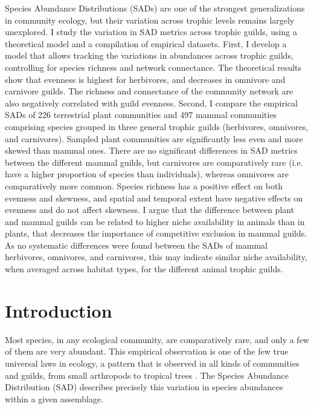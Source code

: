 Species Abundance Distributions (SADs) are one of the strongest generalizations in community ecology, but their variation across trophic levels remains largely unexplored. I study the variation in SAD metrics across trophic guilds, using a theoretical model and a compilation of empirical datasets. First, I develop a model that allows tracking the variations in abundances across trophic guilds, controlling for species richness and network connectance. The theoretical results show that evenness is highest for herbivores, and decreases in omnivore and carnivore guilds. The richness and connectance of the community network are also negatively correlated with guild evenness. Second, I compare the empirical SADs of 226 terrestrial plant communities and 497 mammal communities comprising species grouped in three general trophic guilds (herbivores, omnivores, and carnivores). Sampled plant communities are significantly less even and more skewed than mammal ones. There are no significant differences in SAD metrics between the different mammal guilds, but carnivores are comparatively rare (i.e. have a higher proportion of species than individuals), whereas omnivores are comparatively more common. Species richness has a positive effect on both evenness and skewness, and spatial and temporal extent have negative effects on evenness and do not affect skewness. I argue that the difference between plant and mammal guilds can be related to higher niche availability in animals than in plants, that decreases the importance of competitive exclusion in mammal guilds. As no systematic differences were found between the SADs of mammal herbivores, omnivores, and carnivores, this may indicate similar niche availability, when averaged across habitat types, for the different animal trophic guilds.

\section{Introduction}

Most species, in any ecological community, are comparatively rare, and only a few of them are very abundant. This empirical observation is one of the few true universal laws in ecology, a pattern that is observed in all kinds of communities and guilds, from small arthropods \citep{Basset1991} to tropical trees \citep{He1997}. The Species Abundance Distribution (SAD) describes precisely this variation in species abundances within a given assemblage.

